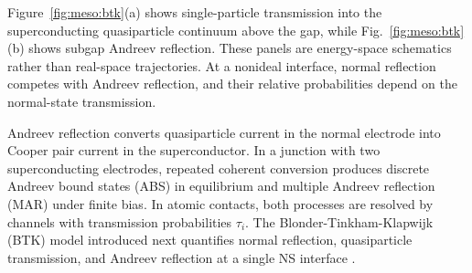         Figure~\ref{fig:meso:btk}(a) shows single-particle transmission into the superconducting quasiparticle continuum above the gap, while Fig.~\ref{fig:meso:btk}(b) shows subgap Andreev reflection. These panels are energy-space schematics rather than real-space trajectories. At a nonideal interface, normal reflection competes with Andreev reflection, and their relative probabilities depend on the normal-state transmission.

        Andreev reflection converts quasiparticle current in the normal electrode into Cooper pair current in the superconductor. In a junction with two superconducting electrodes, repeated coherent conversion produces discrete Andreev bound states (ABS) in equilibrium and multiple Andreev reflection (MAR) under finite bias. In atomic contacts, both processes are resolved by channels with transmission probabilities $\tau_i$. The Blonder-Tinkham-Klapwijk (BTK) model introduced next quantifies normal reflection, quasiparticle transmission, and Andreev reflection at a single NS interface \cite{blonder_transition_1982,beenakker_quantum_1992}.


